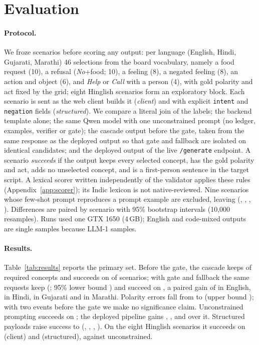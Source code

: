 \section{Evaluation}
\label{sec:eval}

\paragraph{Protocol.}
We froze \NScen{} scenarios before scoring any output: per language (English, Hindi, Gujarati, Marathi) 46 selections from the board vocabulary, namely a food request (10), a refusal (\emph{No}+food; 10), a feeling (8), a negated feeling (8), an action and object (6), and \emph{Help} or \emph{Call} with a person (4), with gold polarity and act fixed by the grid; eight Hinglish scenarios form an exploratory block.
Each scenario is sent as the web client builds it (\emph{client}) and with explicit \texttt{intent} and \texttt{negation} fields (\emph{structured}). We compare a literal join of the labels; the backend template alone; the same Qwen model with one unconstrained prompt (no ledger, examples, verifier or gate); the cascade output before the gate, taken from the same response as the deployed output so that gate and fallback are isolated on identical candidates; and the deployed output of the live \texttt{/generate} endpoint.
A scenario \emph{succeeds} if the output keeps every selected concept, has the gold polarity and act, adds no unselected concept, and is a first-person sentence in the target script.
A lexical scorer written independently of the validator applies these rules (Appendix~\ref{app:scorer}); its Indic lexicon is not native-reviewed.
Nine scenarios whose few-shot prompt reproduces a prompt example are excluded, leaving \NPrimAll{} (\NPrimEN{}, \NPrimHI{}, \NPrimGU{}, \NPrimMR{}).
Differences are paired by scenario with 95\% bootstrap intervals (10,000 resamples). Runs used one GTX 1650 (4\,GB); English and code-mixed outputs are single samples because LLM-1 samples.



\paragraph{Results.}
Table~\ref{tab:results} reports the primary set.
Before the gate, the cascade keeps \KeptPctPre{} of required concepts and succeeds on \SuccPctPre{} of scenarios; with gate and fallback the same requests keep \KeptDepU{} (\KeptPctDepU{}; 95\% lower bound \CPallConcept{}) and succeed on \SuccPctDepU{}, a paired gain of \PDPEN{} in English, \PDPHI{} in Hindi, \PDPGU{} in Gujarati and \PDPMR{} in Marathi.
Polarity errors fall from \PolErrPre{} to \PolErrDepU{} (upper bound \CPzeroPol{}); with two events before the gate we make no significance claim.
Unconstrained prompting succeeds on \SuccPctNaive{}; the deployed pipeline gains \PDNEN{}, \PDNHI{}, \PDNGU{} and \PDNMR{} over it.
Structured payloads raise success to \SuccPctDepS{} (\PSUEN{}, \PSUHI{}, \PSUGU{}, \PSUMR{}).
On the eight Hinglish scenarios it succeeds on \CMSuccDepU{} (client) and \CMSuccDepS{} (structured), against \CMSuccNaive{} unconstrained.

